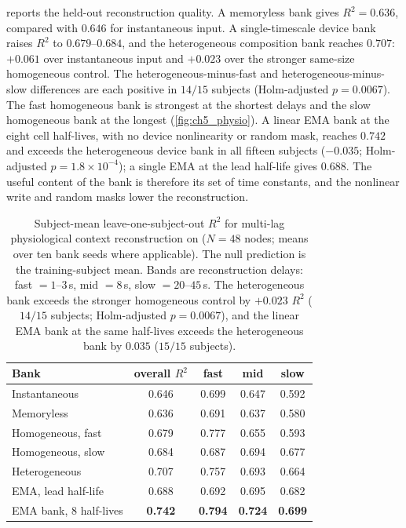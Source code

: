 \documentclass[12pt, twoside]{report}
\begin{document}
 reports the held-out reconstruction quality. A memoryless bank gives $R^2 = 0.636$, compared with $0.646$ for instantaneous input. A single-timescale device bank raises $R^2$ to $0.679$--$0.684$, and the heterogeneous composition bank reaches $0.707$: $+0.061$ over instantaneous input and $+0.023$ over the stronger same-size homogeneous control. The heterogeneous-minus-fast and heterogeneous-minus-slow differences are each positive in $14/15$ subjects (Holm-adjusted $p=0.0067$). The fast homogeneous bank is strongest at the shortest delays and the slow homogeneous bank at the longest (\cref{fig:ch5_physio}). A linear EMA bank at the eight cell half-lives, with no device nonlinearity or random mask, reaches $0.742$ and exceeds the heterogeneous device bank in all fifteen subjects ($-0.035$; Holm-adjusted $p=1.8\times10^{-4}$); a single EMA at the lead half-life gives $0.688$. The useful content of the bank is therefore its set of time constants, and the nonlinear write and random masks lower the reconstruction.

\begin{table}[t]
  \centering
  \small
  \setlength{\tabcolsep}{5pt}
  \caption[Physiological temporal-context reconstruction on WESAD]{Subject-mean leave-one-subject-out $R^2$ for multi-lag physiological context reconstruction on \WESAD{} ($N=48$ nodes; means over ten bank seeds where applicable). The null prediction is the training-subject mean. Bands are reconstruction delays: fast $=1$--$3$\,s, mid $=8$\,s, slow $=20$--$45$\,s. The heterogeneous bank exceeds the stronger homogeneous control by $+0.023$ $R^2$ ($14/15$ subjects; Holm-adjusted $p=0.0067$), and the linear EMA bank at the same half-lives exceeds the heterogeneous bank by $0.035$ ($15/15$ subjects).}
  \label{tab:ch5_physio}
  \begin{tabular}{lcccc}
    \toprule
    Bank & overall $R^2$ & fast & mid & slow \\
    \midrule
    Instantaneous     & 0.646 & 0.699 & 0.647 & 0.592 \\
    Memoryless        & 0.636 & 0.691 & 0.637 & 0.580 \\
    Homogeneous, fast & 0.679 & 0.777 & 0.655 & 0.593 \\
    Homogeneous, slow & 0.684 & 0.687 & 0.694 & 0.677 \\
    Heterogeneous     & 0.707 & 0.757 & 0.693 & 0.664 \\
    \midrule
    EMA, lead half-life       & 0.688 & 0.692 & 0.695 & 0.682 \\
    EMA bank, 8 half-lives    & \textbf{0.742} & \textbf{0.794} & \textbf{0.724} & \textbf{0.699} \\
    \bottomrule
  \end{tabular}
\end{table}
\end{document}
